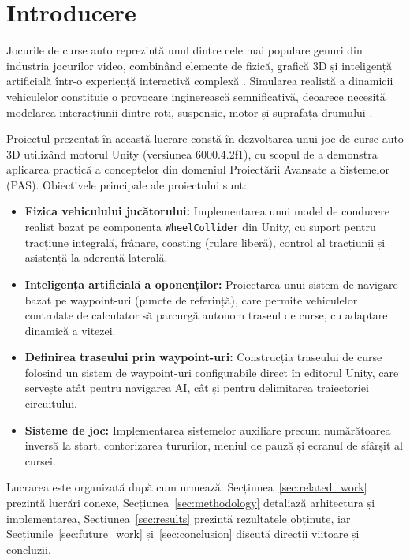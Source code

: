 \section{Introducere}
\label{sec:introduction}

Jocurile de curse auto reprezintă unul dintre cele mai populare genuri din industria jocurilor video, combinând elemente de fizică, grafică 3D și inteligență artificială într-o experiență interactivă complexă \cite{rabin2009introduction}. Simularea realistă a dinamicii vehiculelor constituie o provocare inginerească semnificativă, deoarece necesită modelarea interacțiunii dintre roți, suspensie, motor și suprafața drumului \cite{pacejka2012tire}.

Proiectul prezentat în această lucrare constă în dezvoltarea unui joc de curse auto 3D utilizând motorul Unity (versiunea 6000.4.2f1), cu scopul de a demonstra aplicarea practică a conceptelor din domeniul Proiectării Avansate a Sistemelor (PAS). Obiectivele principale ale proiectului sunt:

\begin{itemize}
    \item \textbf{Fizica vehiculului jucătorului:} Implementarea unui model de conducere realist bazat pe componenta \texttt{WheelCollider} din Unity, cu suport pentru tracțiune integrală, frânare, coasting (rulare liberă), control al tracțiunii și asistență la aderență laterală.
    
    \item \textbf{Inteligența artificială a oponenților:} Proiectarea unui sistem de navigare bazat pe waypoint-uri (puncte de referință), care permite vehiculelor controlate de calculator să parcurgă autonom traseul de curse, cu adaptare dinamică a vitezei.
    
    \item \textbf{Definirea traseului prin waypoint-uri:} Construcția traseului de curse folosind un sistem de waypoint-uri configurabile direct în editorul Unity, care servește atât pentru navigarea AI, cât și pentru delimitarea traiectoriei circuitului.

    \item \textbf{Sisteme de joc:} Implementarea sistemelor auxiliare precum numărătoarea inversă la start, contorizarea tururilor, meniul de pauză și ecranul de sfârșit al cursei.
\end{itemize}

Lucrarea este organizată după cum urmează: Secțiunea~\ref{sec:related_work} prezintă lucrări conexe, Secțiunea~\ref{sec:methodology} detaliază arhitectura și implementarea, Secțiunea~\ref{sec:results} prezintă rezultatele obținute, iar Secțiunile~\ref{sec:future_work} și~\ref{sec:conclusion} discută direcții viitoare și concluzii.
